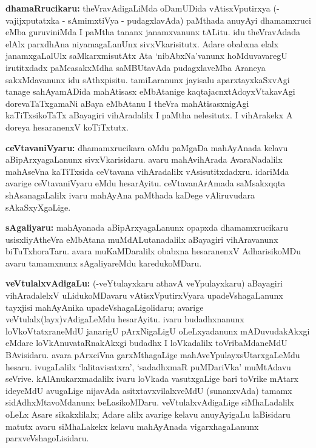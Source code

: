 {\bf dhamaRrucikaru:} theVravAdigaLiMda oDamUDida vAtisxVputirxya (- vajijxputatxka - sAmimxtiVya - pudagxlavAda) paMthada anuyAyi dhamamxruci eMba guruviniMda I paMtha tananx janamxvanunx tALitu. idu theVravAdada elAlx parxdhAna niyamagaLanUnx sivxVkarisitutx. Adare obabxna elalx janamxgaLalUlx saMkarxmisutAtx Ata `nibAbxNa'vanunx hoMdu\-vavaregU irutitxdadx paMcasakxMdha saMBUtavAda pudagxlaveMba Araneya sakxMdavanunx idu sAthxpisitu. tamiLaranunx jayisalu aparxtayxkaSxvAgi tanage sahAyamADida mahAtisasx eMbAtanige kaqtajacnxtAdoyxVtakavAgi dorevaTaTxgamaNi aBaya eMbAtanu I theVra mahAtisasxnigAgi kaTiTxsikoTaTx aBayagiri vihAradalilx I paMtha nelesitutx. I vihArakekx A doreya hesaranenxV koTiTxtutx.

{\bf ceVtavaniVyaru:} dhamamxrucikara oMdu paMgaDa mahAyAnada kelavu aBipArxya\-gaLanunx sivxVkarisidaru. avaru mahAvihArada AvaraNadalilx mahAseVna kaTiTxsida ceVtavana vihAradalilx vAsisutitxdadxru. idariMda avarige ceVtavaniVyaru eMdu hesarAyitu. ceVtavanArAmada saMsakxqqta shAsanagaLalilx ivaru mahAyAna paMthada kaDege vAliruvudara sAkaSxyXgaLige.

{\bf sAgaliyaru:} mahAyanada aBipArxyagaLanunx opapxda dhamamxrucikaru usisxliyA\-theVra eMbAtana muMdALutanadalilx aBayagiri vihAravanunx biTuTxhoraTaru. avara muKaMDaralilx obabxna hesaranenxV AdharisikoMDu avaru tamamxnunx sAgaliyareMdu karedukoMDaru.

{\bf veVtulalxvAdigaLu:} (-veYtulayxkaru athavA veYpulayxkaru) aBayagiri vihAradalelxV uLidukoMDavaru vAtisxVputirxVyara upadeVshagaLanunx tayxjisi mahAyAnika upa\-deVsha\-gaLigolidaru; avarige veVtulalx(layx)vAdigaLeMdu hesarAyitu. ivaru budadhxnanunx loVkoVtatxraneMdU janarigU pArxNigaLigU oLeLxyadanunx mADuvudakAkxgi eMdare loVkAnuvataRnakAkxgi budadhx I loVkadalilx toVribaMdaneMdU BAvisidaru. avara pArxciVna garxMthagaLige mahAveYpulayxsUtarxgaLeMdu hesaru. ivugaLalilx  `lalitavisatxra', `sadadhxmaR puMDariVka' muMtAdavu seVrive. kAlAnukarxmadalilx ivaru loVkada vasutxgaLige bari toVrike mAtarx ideyeMdU avugaLige nijavAda asitxtavxvilalxveMdU (sunanxvAda) tamamx sidAdhxMtavoMdanunx beLasikoMDaru. veVtulalxvAdigaLige siMhaLadalilx oLeLx Asare sikakxlilalx; Adare alilx avarige kelavu anuyAyigaLu laBisidaru matutx avaru siMhaLakekx kelavu mahAyAnada vigarxhagaLanunx parxveVshagoLisidaru.

